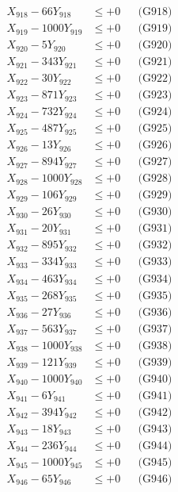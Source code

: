 \documentclass[a4paper,10pt]{article}
\begin{document}
{\begin{align}
X_{918} - 66Y_{918} &\leq +0 && \text{(G918)} \\
X_{919} - 1000Y_{919} &\leq +0 && \text{(G919)} \\
X_{920} - 5Y_{920} &\leq +0 && \text{(G920)} \\
\allowbreak
X_{921} - 343Y_{921} &\leq +0 && \text{(G921)} \\
X_{922} - 30Y_{922} &\leq +0 && \text{(G922)} \\
X_{923} - 871Y_{923} &\leq +0 && \text{(G923)} \\
X_{924} - 732Y_{924} &\leq +0 && \text{(G924)} \\
X_{925} - 487Y_{925} &\leq +0 && \text{(G925)} \\
X_{926} - 13Y_{926} &\leq +0 && \text{(G926)} \\
X_{927} - 894Y_{927} &\leq +0 && \text{(G927)} \\
X_{928} - 1000Y_{928} &\leq +0 && \text{(G928)} \\
X_{929} - 106Y_{929} &\leq +0 && \text{(G929)} \\
X_{930} - 26Y_{930} &\leq +0 && \text{(G930)} \\
\allowbreak
X_{931} - 20Y_{931} &\leq +0 && \text{(G931)} \\
X_{932} - 895Y_{932} &\leq +0 && \text{(G932)} \\
X_{933} - 334Y_{933} &\leq +0 && \text{(G933)} \\
X_{934} - 463Y_{934} &\leq +0 && \text{(G934)} \\
X_{935} - 268Y_{935} &\leq +0 && \text{(G935)} \\
X_{936} - 27Y_{936} &\leq +0 && \text{(G936)} \\
X_{937} - 563Y_{937} &\leq +0 && \text{(G937)} \\
X_{938} - 1000Y_{938} &\leq +0 && \text{(G938)} \\
X_{939} - 121Y_{939} &\leq +0 && \text{(G939)} \\
X_{940} - 1000Y_{940} &\leq +0 && \text{(G940)} \\
\allowbreak
X_{941} - 6Y_{941} &\leq +0 && \text{(G941)} \\
X_{942} - 394Y_{942} &\leq +0 && \text{(G942)} \\
X_{943} - 18Y_{943} &\leq +0 && \text{(G943)} \\
X_{944} - 236Y_{944} &\leq +0 && \text{(G944)} \\
X_{945} - 1000Y_{945} &\leq +0 && \text{(G945)} \\
X_{946} - 65Y_{946} &\leq +0 && \text{(G946)} \\

\end{align}}
\end{document}
